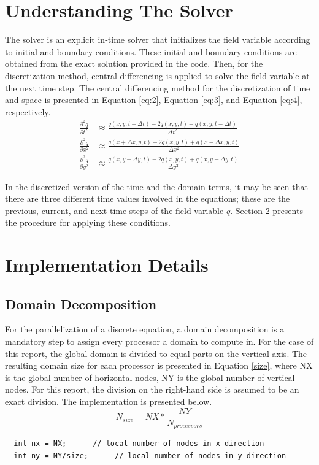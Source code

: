 \documentclass[12pt]{article}
\begin{document}
\section{Understanding The Solver}
\label{sec:2}
 The solver is an explicit in-time solver that initializes the field variable according to initial and boundary conditions. These initial and boundary conditions are obtained from the exact solution provided in the code. Then, for the discretization method, central differencing is applied to solve the field variable at the next time step. The central differencing method for the discretization of time and space is presented in Equation \ref{eq:2}, Equation \ref{eq:3}, and Equation \ref{eq:4}, respectively.
\begin{align}
\label{eq:2}
\frac{\partial^2 q}{\partial t^2} &\approx \frac{q(x, y, t + \Delta t) - 2q(x, y, t) + q(x, y, t - \Delta t)}{\Delta t^2} \\
\label{eq:3}
\frac{\partial^2 q}{\partial x^2} &\approx \frac{q(x + \Delta x, y, t) - 2q(x, y, t) + q(x - \Delta x, y, t)}{\Delta x^2} \\
\label{eq:4}
\frac{\partial^2 q}{\partial y^2} &\approx \frac{q(x, y + \Delta y, t) - 2q(x, y, t) + q(x, y - \Delta y, t)}{\Delta y^2}
\end{align}

\noindent
In the discretized version of the time and the domain terms, it may be seen that there are three different time values involved in the equations; these are the previous, current, and next time steps of the field variable $q$. Section \ref{sec:3} presents the procedure for applying these conditions.

\section{Implementation Details}
\label{sec:3}
\subsection{Domain Decomposition}
For the parallelization of a discrete equation, a domain decomposition is a mandatory step to assign every processor a domain to compute in. For the case of this report, the global domain is divided to equal parts on the vertical axis. The resulting domain size for each processor is presented in Equation \ref{size}, where NX is the global number of horizontal nodes, NY is the global number of vertical nodes. For this report, the division on the right-hand side is assumed to be an exact division. The implementation is presented below.
\begin{equation}
\label{size}
    N_{size} = NX*\frac{NY}{N_{processors}}
\end{equation}
    \begin{verbatim}
  int nx = NX;      // local number of nodes in x direction
  int ny = NY/size;      // local number of nodes in y direction
    \end{verbatim}
\end{document}
